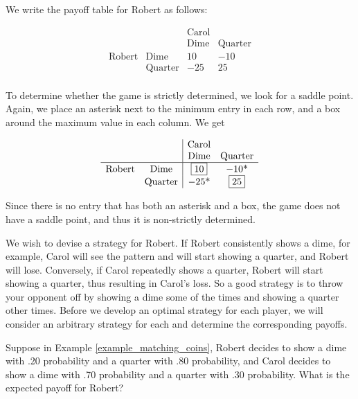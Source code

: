 \begin{solution}
    We write the payoff table for Robert as follows:

    \[
        \begin{array}{cc|cc}
                          &                & \text{Carol} &                \\
                          &                & \text{Dime}  & \text{Quarter} \\
            \hline
            \text{Robert} & \text{Dime}    & 10           & -10            \\
                          & \text{Quarter} & -25          & 25             \\
        \end{array}
    \]

    To determine whether the game is strictly determined, we look for a saddle point. Again, we place an asterisk next to the minimum entry in each row, and a box around the maximum value in each column. We get

    \[
        \begin{array}{cc|cc}
                          &                & \text{Carol} &                \\
                          &                & \text{Dime}  & \text{Quarter} \\
            \hline
            \text{Robert} & \text{Dime}    & \fbox{10}    & -10\text{*}    \\
                          & \text{Quarter} & -25\text{*}  & \fbox{25}      \\
        \end{array}
    \]

    Since there is no entry that has both an asterisk and a box, the game does not have a saddle point, and thus it is non-strictly determined.
\end{solution}

We wish to devise a strategy for Robert.   If Robert consistently shows a dime, for example, Carol will see the pattern and will start showing a quarter, and Robert will lose.  Conversely, if Carol repeatedly shows a quarter, Robert will start showing a quarter, thus resulting in Carol's loss.  So a good strategy is to throw your opponent off by showing a dime some of the times and showing a quarter other times.  Before we develop an optimal strategy for each player, we will consider an arbitrary strategy for each and determine the corresponding payoffs.

\begin{example}
    Suppose in Example \ref{example_matching_coins}, Robert decides to show a dime with .20 probability and a quarter with .80 probability, and Carol decides to show a dime with .70 probability and a quarter with .30 probability. What is the expected payoff for Robert?
\end{example}

